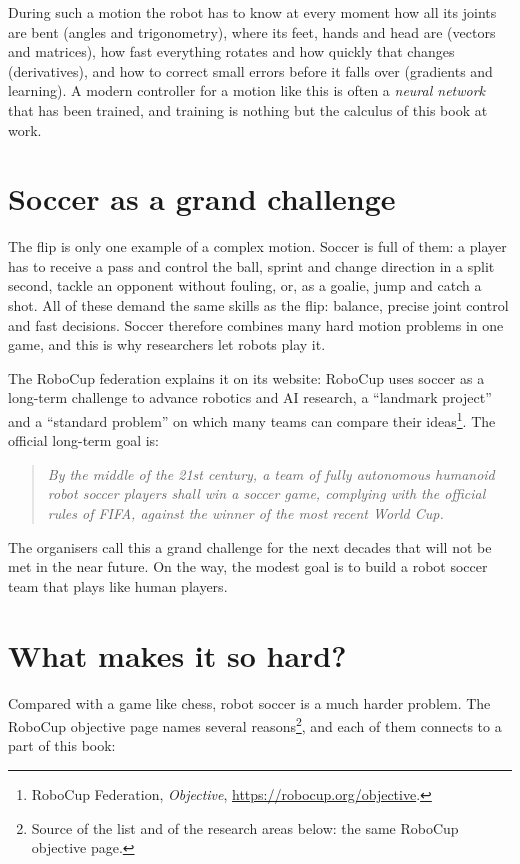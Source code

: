 During such a motion the robot has to know at every moment how all its joints are bent (angles and trigonometry), where its feet, hands and head are (vectors and matrices), how fast everything rotates and how quickly that changes (derivatives), and how to correct small errors before it falls over (gradients and learning). A modern controller for a motion like this is often a \emph{neural network} that has been trained, and training is nothing but the calculus of this book at work.

\section*{Soccer as a grand challenge}
The flip is only one example of a complex motion. Soccer is full of them: a player has to receive a pass and control the ball, sprint and change direction in a split second, tackle an opponent without fouling, or, as a goalie, jump and catch a shot. All of these demand the same skills as the flip: balance, precise joint control and fast decisions. Soccer therefore combines many hard motion problems in one game, and this is why researchers let robots play it.

The RoboCup federation explains it on its website: RoboCup uses soccer as a long-term challenge to advance robotics and AI research, a ``landmark project'' and a ``standard problem'' on which many teams can compare their ideas\footnote{RoboCup Federation, \emph{Objective}, \url{https://robocup.org/objective}.}. The official long-term goal is:

\begin{quote}
\emph{By the middle of the 21st century, a team of fully autonomous humanoid robot soccer players shall win a soccer game, complying with the official rules of FIFA, against the winner of the most recent World Cup.}
\end{quote}

The organisers call this a grand challenge for the next decades that will not be met in the near future. On the way, the modest goal is to build a robot soccer team that plays like human players.

\section*{What makes it so hard?}
Compared with a game like chess, robot soccer is a much harder problem. The RoboCup objective page names several reasons\footnote{Source of the list and of the research areas below: the same RoboCup objective page.}, and each of them connects to a part of this book:

